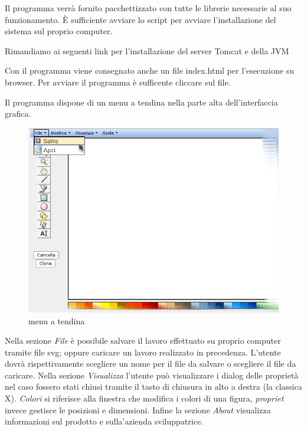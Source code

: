 
Il programma verr\`a fornito pacchettizzato con tutte le librerie necessarie al suo funzionamento. \`E sufficiente avviare lo script per avviare l'installazione del sistema sul proprio computer.

Rimandiamo ai seguenti link per l'installazione del server Tomcat e della JVM
 
Con il programma viene consegnato anche un file index.html per l'esecuzione su browser. 
Per avviare il programma \`e sufficente cliccare sul file.

Il programma dispone di un menu a tendina nella parte alta dell'interfaccia grafica.

\begin{figure}[!ht]
\centering
\includegraphics[scale=4]{images/menu.png}
\caption{menu a tendina}
\end{figure} 

Nella sezione \textit{File} \`e possibile salvare il lavoro effettuato su proprio computer tramite file svg; oppure caricare un lavoro realizzato in precedenza. 
L'utente dovr\`a rispettivamente scegliere un nome per il file da salvare o scegliere il file da caricare.
Nella sezione \textit{Visualizza} l'utente pu\`o visualizzare i dialog delle propriet\`a nel caso fossero stati chiusi  tramite il tasto di chiusura in alto a destra (la classica X). \textit{Colori} si riferisce alla finestra che modifica i colori di una figura, \textit{propriet} invece gestisce le posizioni e dimensioni.
Infine la sezione \textit{About} visualizza informazioni sul prodotto e sulla'azienda sviluppatrice.


